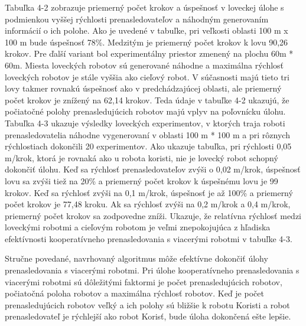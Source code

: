 \justifying 
\noindent 
Tabuľka 4-2 zobrazuje priemerný počet krokov a úspešnosť v loveckej úlohe s podmienkou vyššej rýchlosti prenasledovateľov a náhodným generovaním informácií o ich polohe. Ako je uvedené v tabuľke, pri veľkosti oblasti 100 m x 100 m bude úspešnosť 78\%. Medzitým je priemerný počet krokov k lovu 90,26 krokov. Pre ďalší variant bol experimentálny priestor zmenený na plochu 60m * 60m. Miesta loveckých robotov sú generované náhodne a maximálna rýchlosť loveckých robotov je stále vyššia ako cieľový robot. V súčasnosti majú tieto tri lovy takmer rovnakú úspešnosť ako v predchádzajúcej oblasti, ale priemerný počet krokov je znížený na 62,14 krokov. Teda údaje v tabuľke 4-2 ukazujú, že počiatočné polohy prenasledujúcich robotov majú vplyv na poľovnícku úlohu. 
Tabuľka 4-3 ukazuje výsledky loveckých experimentov, v ktorých traja roboti prenasledovatelia náhodne vygenerovaní v oblasti 100 m * 100 m a pri rôznych rýchlostiach dokončili 20 experimentov. Ako ukazuje tabuľka, pri rýchlosti 0,05 m/krok, ktorá je rovnaká ako u robota koristi, nie je lovecký robot schopný dokončiť úlohu. Keď sa rýchlosť prenasledovateľov zvýši o 0,02 m/krok, úspešnosť lovu sa zvýši tiež na 20\% a priemerný počet krokov k úspešnému lovu je 99 krokov. Keď sa rýchlosť zvýši na 0,1 m/krok, úspešnosť je až 100\% a priemerný počet krokov je 77,48 kroku. Ak sa rýchlosť zvýši na 0,2 m/krok a 0,4 m/krok, priemerný počet krokov sa zodpovedne zníži. Ukazuje, že relatívna rýchlosť medzi loveckými robotmi a cieľovým robotom je veľmi znepokojujúca z hľadiska efektívnosti kooperatívneho prenasledovania s viacerými robotmi v tabuľke 4-3.
\vspace{3mm}

\justifying
\noindent 
Stručne povedané, navrhovaný algoritmus môže efektívne dokončiť úlohy prenasledovania s viacerými robotmi. Pri úlohe kooperatívneho prenasledovania s viacerými robotmi sú dôležitými faktormi je počet prenasledujúcich robotov, počiatočná poloha robotov a maximálna rýchlosť robotov. Keď je počet prenasledujúcich robotov veľký a ich polohy sú bližšie k robotu Koristi a robot prenasledovateľ je rýchlejší ako robot Korisť, bude úloha dokončená ešte lepšie. 

    


